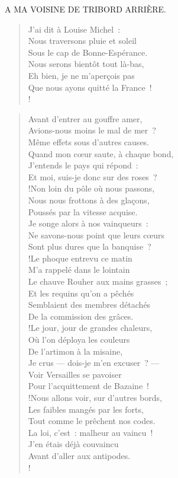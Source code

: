 \documentclass[french,twoside]{book} %
\newenvironment{quoteblock}%
  {\begin{quoting}}
  {\end{quoting}}
\newenvironment{quotebar}{%
    \def\FrameCommand{{\color{rubric!10!}\vrule width 0.5em} \hspace{0.9em}}%
    \def\OuterFrameSep{\itemsep} %
    \MakeFramed {\advance\hsize-\width \FrameRestore}
  }%
  {%
    \endMakeFramed
  }
\renewenvironment{quoteblock}%
  {%
    \savenotes
    \setstretch{0.9}
    \normalfont
    \begin{quotebar}
  }
  {%
    \end{quotebar}
    \spewnotes
  }
\begin{document}
\begin{quoteblock}
A MA VOISINE DE TRIBORD ARRIÈRE.\end{quoteblock}

\begin{verse}
J’ai dit à Louise Michel :\\
Nous traversons pluie et soleil\\
Sous le cap de Bonne-Espérance.\\
Nous serons bientôt tout là-bas,\\
Eh bien, je ne m’aperçois pas\\
Que nous ayons quitté la France !\\!
\end{verse}
\begin{quoteblock}
 \end{quoteblock}

\begin{verse}
Avant d’entrer au gouffre amer,\\
Avions-nous moins le mal de mer ?\\
Même effets sous d’autres causes.\\
Quand mon cœur saute, à chaque bond,\\
J’entends le pays qui répond :\\
Et moi, suis-je donc sur des roses ?\\!Non loin du pôle où nous passons,\\
Nous nous frottons à des glaçons,\\
Poussés par la vitesse acquise.\\
Je songe alors à nos vainqueurs :\\
Ne savons-nous point que leurs cœurs \\
Sont plus dures que la banquise ?\\!Le phoque entrevu ce matin\\
M’a rappelé dans le lointain\\
Le chauve Rouher aux mains grasses ; \\
Et les requins qu’on a pêchés\\
Semblaient des membres détachés\\
De la commission des grâces.\\!Le jour, jour de grandes chaleurs,\\
Où l’on déploya les couleurs\\
De l’artimon à la misaine,\\
Je crus — dois-je m’en excuser ? —\\
Voir Versailles se pavoiser\\
Pour l’acquittement de Bazaine !\\!Nous allons voir, sur d’autres bords,\\
Les faibles mangés par les forts,\\
Tout comme le prêchent nos codes.\\
La loi, c’est : malheur au vaincu !\\
J’en étais déjà couvaincu\\
Avant d’aller aux antipodes.\\!
\end{verse}
\begin{quoteblock}
 \end{quoteblock}
\end{document}
